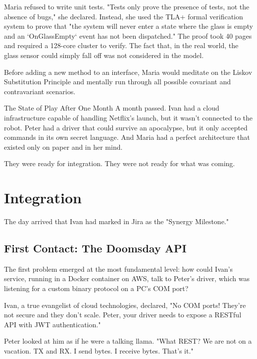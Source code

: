 Maria refused to write unit tests. "Tests only prove the presence of tests, not the absence of bugs," she declared. Instead, she used the TLA+ formal verification system to prove that "the system will never enter a state where the glass is empty and an `OnGlassEmpty` event has not been dispatched." The proof took 40 pages and required a 128-core cluster to verify. The fact that, in the real world, the glass sensor could simply fall off was not considered in the model.

Before adding a new method to an interface, Maria would meditate on the Liskov Substitution Principle and mentally run through all possible covariant and contravariant scenarios.

\begin{infobox}{The State of Play After One Month}
A month passed. Ivan had a cloud infrastructure capable of handling Netflix's launch, but it wasn't connected to the robot. Peter had a driver that could survive an apocalypse, but it only accepted commands in its own secret language. And Maria had a perfect architecture that existed only on paper and in her mind.

They were ready for integration. They were not ready for what was coming.
\end{infobox}

\section{Integration}
\label{sec:parable_integration}

The day arrived that Ivan had marked in Jira as the "Synergy Milestone." 

\subsection*{First Contact: The Doomsday API}

The first problem emerged at the most fundamental level: how could Ivan's service, running in a Docker container on AWS, talk to Peter's driver, which was listening for a custom binary protocol on a PC's COM port?

Ivan, a true evangelist of cloud technologies, declared, "No COM ports! They're not secure and they don't scale. Peter, your driver needs to expose a RESTful API with JWT authentication."

Peter looked at him as if he were a talking llama. "What REST? We are not on a vacation. TX and RX. I send bytes. I receive bytes. That's it."

